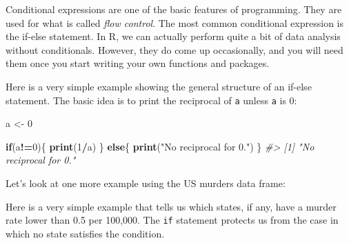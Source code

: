 \documentclass[
]{krantz}
\newenvironment{Shaded}{\begin{snugshade}}{\end{snugshade}}
\newcommand{\CommentTok}[1]{\textcolor[rgb]{0.37,0.37,0.37}{\textit{#1}}}
\newcommand{\ControlFlowTok}[1]{\textcolor[rgb]{0.27,0.27,0.27}{\textbf{#1}}}
\newcommand{\DecValTok}[1]{\textcolor[rgb]{0.06,0.06,0.06}{#1}}
\newcommand{\FloatTok}[1]{\textcolor[rgb]{0.06,0.06,0.06}{#1}}
\newcommand{\KeywordTok}[1]{\textcolor[rgb]{0.27,0.27,0.27}{\textbf{#1}}}
\newcommand{\NormalTok}[1]{#1}
\newcommand{\OperatorTok}[1]{\textcolor[rgb]{0.43,0.43,0.43}{\textbf{#1}}}
\newcommand{\StringTok}[1]{\textcolor[rgb]{0.5,0.5,0.5}{#1}}
\begin{document}
Conditional expressions are one of the basic features of programming. They are used for what is called \emph{flow control}. The most common conditional expression is the if-else statement. In R, we can actually perform quite a bit of data analysis without conditionals. However, they do come up occasionally, and you will need them once you start writing your own functions and packages.

Here is a very simple example showing the general structure of an if-else statement. The basic idea is to print the reciprocal of \texttt{a} unless \texttt{a} is 0:

\begin{Shaded}
\begin{Highlighting}[]
\NormalTok{a <-}\StringTok{ }\DecValTok{0}

\ControlFlowTok{if}\NormalTok{(a}\OperatorTok{!=}\DecValTok{0}\NormalTok{)\{}
  \KeywordTok{print}\NormalTok{(}\DecValTok{1}\OperatorTok{/}\NormalTok{a)}
\NormalTok{\} }\ControlFlowTok{else}\NormalTok{\{}
  \KeywordTok{print}\NormalTok{(}\StringTok{"No reciprocal for 0."}\NormalTok{)}
\NormalTok{\}}
\CommentTok{#> [1] "No reciprocal for 0."}
\end{Highlighting}
\end{Shaded}

Let's look at one more example using the US murders data frame:

\begin{Shaded}
\end{Shaded}

Here is a very simple example that tells us which states, if any, have a murder rate lower than 0.5 per 100,000. The \texttt{if} statement protects us from the case in which no state satisfies the condition.

\begin{Shaded}
\end{Shaded}
\end{document}
